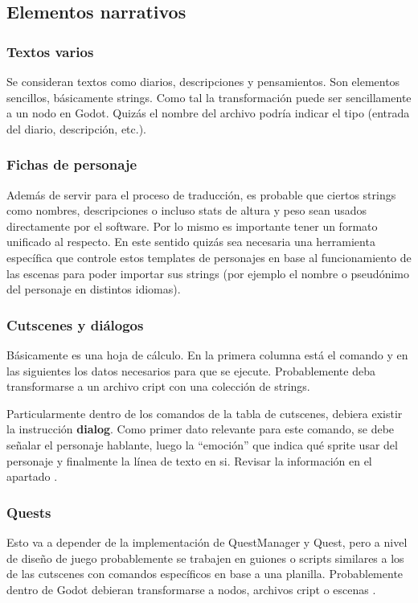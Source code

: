 \subsection{Elementos narrativos}\label{kit:elementos-narrativos}

\subsubsection{Textos varios}\label{kit:textos-varios}
Se consideran textos como diarios, descripciones y pensamientos. Son elementos sencillos, básicamente strings. Como tal la transformación puede ser sencillamente a un nodo en Godot. Quizás el nombre del archivo podría indicar el tipo (entrada del diario, descripción, etc.). 

\subsubsection{Fichas de personaje}\label{kit:fichas-de-personaje}
Además de servir para el proceso de traducción, es probable que ciertos strings como nombres, descripciones o incluso stats de altura y peso sean usados directamente por el software. Por lo mismo es importante tener un formato unificado al respecto. En este sentido quizás sea necesaria una herramienta específica que controle estos templates de personajes en base al funcionamiento de las escenas para poder importar sus strings (por ejemplo el nombre o pseudónimo del personaje en distintos idiomas).

\subsubsection{Cutscenes y diálogos}\label{kit:cutscenes-y-dialogos}
Básicamente es una hoja de cálculo. En la primera columna está el comando y en las siguientes los datos necesarios para que se ejecute. Probablemente deba transformarse a un archivo cript con una colección de strings.

Particularmente dentro de los comandos de la tabla de cutscenes, debiera existir la instrucción \textbf{dialog}. Como primer dato relevante para este comando, se debe señalar el personaje hablante, luego la “emoción” que indica qué sprite usar del personaje y finalmente la línea de texto en si. Revisar la información en el apartado .

\subsubsection{Quests}\label{kit:quests}
Esto va a depender de la implementación de QuestManager y Quest, pero a nivel de diseño de juego probablemente se trabajen en guiones o scripts similares a los de las cutscenes con comandos específicos en base a una planilla. Probablemente dentro de Godot debieran transformarse a nodos, archivos cript o escenas .

